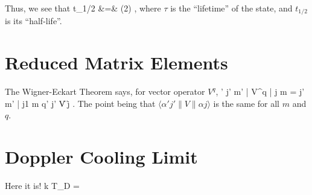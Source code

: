 Thus, we see that 
\bea
t_{1/2} &=& \ln (2) \: \tau, 
\eea
where $\tau$ is the ``lifetime'' of the state, and $t_{1/2}$ is its ``half-life''.

%

\section{Reduced Matrix Elements}
The Wigner-Eckart Theorem says, for vector operator $V^q$,
\beq
\langle \alpha ' j' m' | V^q | \alpha j m \rangle = \langle j' m' | j1 m q\rangle \langle \alpha ' j' \| V \|\alpha j \rangle .
\eeq
The point being that $\langle \alpha ' j' \| V \|\alpha j \rangle$ is the same for all $m$ and $q$.


\section{Doppler Cooling Limit}
Here it is!
\beq
k T_{\textrm{D}} =  \hbar \Gamma
\eeq

